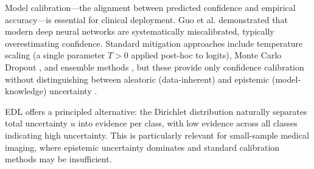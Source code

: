 Model calibration---the alignment between predicted confidence and empirical accuracy---is essential for clinical deployment. Guo et al. \cite{guo2017calibration} demonstrated that modern deep neural networks are systematically miscalibrated, typically overestimating confidence. Standard mitigation approaches include temperature scaling (a single parameter $T > 0$ applied post-hoc to logits), Monte Carlo Dropout \cite{gal2016dropout}, and ensemble methods \cite{lakshminarayanan2017ensemble}, but these provide only confidence calibration without distinguishing between aleatoric (data-inherent) and epistemic (model-knowledge) uncertainty \cite{abdar2021uncertainty,liang2018uncertainty}.

EDL offers a principled alternative: the Dirichlet distribution naturally separates total uncertainty $u$ into evidence per class, with low evidence across all classes indicating high uncertainty. This is particularly relevant for small-sample medical imaging, where epistemic uncertainty dominates and standard calibration methods may be insufficient.
